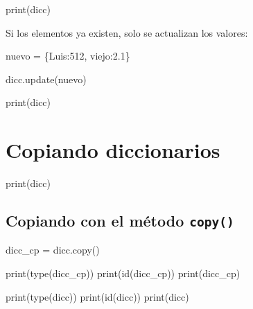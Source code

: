 \documentclass[
  letterpaper,
  DIV=11,
  numbers=noendperiod]{scrreprt}
\newenvironment{Shaded}{\begin{snugshade}}{\end{snugshade}}
\newcommand{\BuiltInTok}[1]{\textcolor[rgb]{0.00,0.23,0.31}{#1}}
\newcommand{\DecValTok}[1]{\textcolor[rgb]{0.68,0.00,0.00}{#1}}
\newcommand{\FloatTok}[1]{\textcolor[rgb]{0.68,0.00,0.00}{#1}}
\newcommand{\NormalTok}[1]{\textcolor[rgb]{0.00,0.23,0.31}{#1}}
\newcommand{\OperatorTok}[1]{\textcolor[rgb]{0.37,0.37,0.37}{#1}}
\newcommand{\StringTok}[1]{\textcolor[rgb]{0.13,0.47,0.30}{#1}}
\begin{document}
\begin{Shaded}
\begin{Highlighting}[]
\BuiltInTok{print}\NormalTok{(dicc)}
\end{Highlighting}
\end{Shaded}

Si los elementos ya existen, solo se actualizan los valores:

\begin{Shaded}
\begin{Highlighting}[]
\NormalTok{nuevo }\OperatorTok{=}\NormalTok{ \{}\StringTok{\textquotesingle{}Luis\textquotesingle{}}\NormalTok{:}\DecValTok{512}\NormalTok{, }\StringTok{\textquotesingle{}viejo\textquotesingle{}}\NormalTok{:}\FloatTok{2.1}\NormalTok{\}}
\end{Highlighting}
\end{Shaded}

\begin{Shaded}
\begin{Highlighting}[]
\NormalTok{dicc.update(nuevo)}
\end{Highlighting}
\end{Shaded}

\begin{Shaded}
\begin{Highlighting}[]
\BuiltInTok{print}\NormalTok{(dicc)}
\end{Highlighting}
\end{Shaded}

\section{Copiando diccionarios}\label{copiando-diccionarios}

\begin{Shaded}
\begin{Highlighting}[]
\BuiltInTok{print}\NormalTok{(dicc)}
\end{Highlighting}
\end{Shaded}

\subsection{\texorpdfstring{Copiando con el método
\texttt{copy()}}{Copiando con el método copy()}}\label{copiando-con-el-muxe9todo-copy-2}

\begin{Shaded}
\begin{Highlighting}[]
\NormalTok{dicc\_cp }\OperatorTok{=}\NormalTok{ dicc.copy()}

\BuiltInTok{print}\NormalTok{(}\BuiltInTok{type}\NormalTok{(dicc\_cp))}
\BuiltInTok{print}\NormalTok{(}\BuiltInTok{id}\NormalTok{(dicc\_cp))}
\BuiltInTok{print}\NormalTok{(dicc\_cp)}

\BuiltInTok{print}\NormalTok{(}\BuiltInTok{type}\NormalTok{(dicc))}
\BuiltInTok{print}\NormalTok{(}\BuiltInTok{id}\NormalTok{(dicc))}
\BuiltInTok{print}\NormalTok{(dicc)}
\end{Highlighting}
\end{Shaded}
\end{document}
